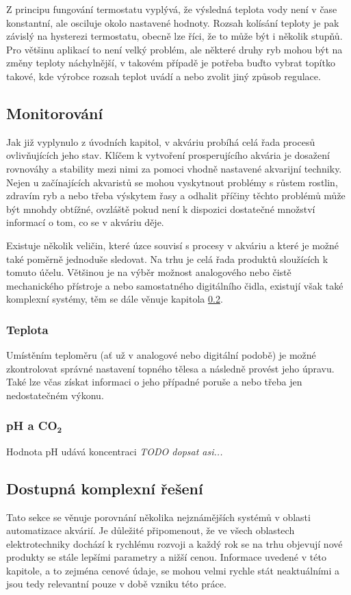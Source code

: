         Z principu fungování termostatu vyplývá, že výsledná teplota vody není v čase konstantní, ale osciluje okolo nastavené hodnoty. Rozsah kolísání teploty je pak závislý na hysterezi termostatu, obecně lze říci, že to může být i několik stupňů. Pro většinu aplikací to není velký problém, ale některé druhy ryb mohou být na změny teploty náchylnější, v takovém případě je potřeba buďto vybrat topítko takové, kde výrobce rozsah teplot uvádí a nebo zvolit jiný způsob regulace. 

    \subsection{Monitorování}
        Jak již vyplynulo z úvodních kapitol, v akváriu probíhá celá řada procesů ovlivňujících jeho stav. Klíčem k vytvoření prosperujícího akvária je dosažení rovnováhy a stability mezi nimi za pomoci vhodně nastavené akvarijní techniky. Nejen u začínajících akvaristů se mohou vyskytnout problémy s růstem rostlin, zdravím ryb a nebo třeba výskytem řasy a odhalit příčiny těchto problémů může být mnohdy obtížné, ovzláště pokud není k dispozici dostatečné množství informací o tom, co se v akváriu děje. 
        
        Existuje několik veličin, které úzce souvisí s procesy v akváriu a které je možné také poměrně jednoduše sledovat. Na trhu je celá řada produktů sloužících k tomuto účelu. Většinou je na výběr možnost analogového nebo čistě mechanického přístroje a nebo samostatného digitálního čidla, existují však také komplexní systémy, těm se dále věnuje kapitola  \ref{lab:kapitola-komplexni-reseni}. 

        \subsubsection{Teplota}
            Umístěním teploměru (ať už v analogové nebo digitální podobě) je možné zkontrolovat správné nastavení topného tělesa a následně provést jeho úpravu. Také lze včas získat informaci o jeho případné poruše a nebo třeba jen nedostatečném výkonu. 
        \subsubsection{pH a CO\(\mathbf{_{2}}\)}
            Hodnota pH udává koncentraci \textit{TODO dopsat asi...} 

             
    \subsection{Dostupná komplexní řešení}
    \label{lab:kapitola-komplexni-reseni}
        Tato sekce se věnuje porovnání několika nejznámějších systémů v oblasti automatizace akvárií. Je důležité připomenout, že ve všech oblastech elektrotechniky dochází k rychlému rozvoji a každý rok se na trhu objevují nové produkty se stále lepšími parametry a nižší cenou. Informace uvedené v této kapitole, a to zejména cenové údaje, se mohou velmi rychle stát neaktuálními a jsou tedy relevantní pouze v době vzniku této práce.

